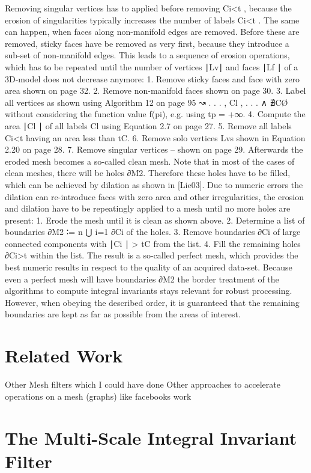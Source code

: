 \documentclass{article}
\begin{document}
Removing singular vertices has to applied before removing Ci<t , because the erosion of singularities typically increases the number of labels Ci<t . The same can happen, when faces along non-manifold edges are removed. Before these are removed, sticky faces have be removed as very first, because they introduce a sub-set of non-manifold edges. This leads to a sequence of erosion operations, which has to be repeated until the number of vertices ∣Lv∣ and faces ∣Lf ∣ of a 3D-model does not decrease anymore:
1. Remove sticky faces and face with zero area shown on page 32.
2. Remove non-manifold faces shown on page 30.
3. Label all vertices as shown using Algorithm 12 on page 95 ↝ {. . . , Cl , . . . } ∧ ∄CØ without considering the function value f(pi), e.g. using tp = +∞.
4. Compute the area ∣Cl ∣ of all labels Cl using Equation 2.7 on page 27.
5. Remove all labels Ci<t having an area less than tC.
6. Remove solo vertices Lvs shown in Equation 2.20 on page 28.
7. Remove singular vertices – shown on page 29.
Afterwards the eroded mesh becomes a so-called clean mesh. Note that in most of the cases of clean meshes, there will be holes ∂M2. Therefore these holes have to be filled, which can be achieved by dilation as shown in [Lie03]. Due to numeric errors the dilation can re-introduce faces with zero area and other irregularities, the erosion and dilation have to be repeatingly applied to a mesh until no more holes are present:
1. Erode the mesh until it is clean as shown above.
2. Determine a list of boundaries ∂M2 ∶= n ⋃ i=1 ∂Ci of the holes.
3. Remove boundaries ∂Ci of large connected components with ∣Ci ∣ > tC from the list.
4. Fill the remaining holes ∂Ci>t within the list.
The result is a so-called perfect mesh, which provides the best numeric results in respect to the quality of an acquired data-set. Because even a perfect mesh will have boundaries ∂M2 the border treatment of the algorithms to compute integral invariants stays relevant for robust processing. However, when obeying the described order, it is guaranteed that the remaining boundaries are kept as far as possible from the areas of interest.~\cite[p.~120]{Mara12}
\section{Related Work}
Other Mesh filters which I could have done
Other approaches to accelerate operations on a mesh
(graphs) like facebooks work
\section{The Multi-Scale Integral Invariant Filter}
\end{document}
